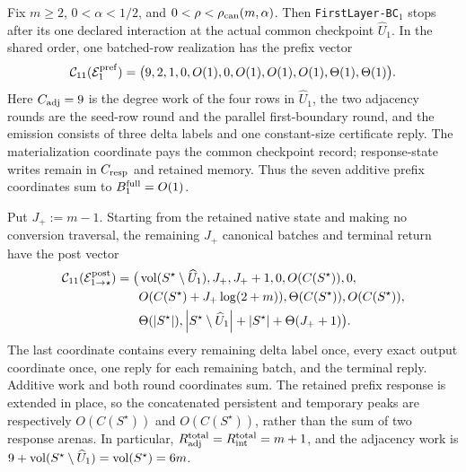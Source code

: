 \begin{theorem}
\label{thm:branch-caterpillar-first-layer-prefix}
Fix $m\geq2$, $0<\alpha<1/2$, and
$0<\rho<\rho_{\rm can}(m,\alpha)$.  Then
\texttt{FirstLayer-BC}$_1$ stops after its one declared interaction at the
actual common checkpoint $\widehat U_1$.  In the shared order, one batched-row
realization has the prefix vector
\begin{equation}
 \mathcal C_{11}(\mathcal E_1^{\rm pref})
 =\bigl(9,2,1,0,O(1),0,O(1),O(1),O(1),\Theta(1),\Theta(1)\bigr).
 \label{eq:branch-caterpillar-first-layer-prefix-eleven-vector}
\end{equation}
Here $C_{\rm adj}=9$ is the degree work of the four rows in
$\widehat U_1$, the two adjacency rounds are the seed-row round and the
parallel first-boundary round, and the emission consists of three delta labels
and one constant-size certificate reply.  The materialization coordinate pays
the common checkpoint record; response-state writes remain in
$C_{\rm resp}$ and retained memory.  Thus the seven additive prefix
coordinates sum to $B_1^{\rm full}=O(1)$.

Put $J_+:=m-1$.  Starting from the retained native state and making no
conversion traversal, the remaining $J_+$ canonical batches and terminal
return have the post vector
\begin{equation}
 \begin{aligned}
 \mathcal C_{11}(\mathcal E_{1\to\star}^{\rm post})=\bigl(&
 \operatorname{vol}(S^\star\setminus\widehat U_1),J_+,J_++1,0,
 O(C(S^\star)),0,\\
 &O(C(S^\star)+J_+\log(2+m)),
 \Theta(C(S^\star)),O(C(S^\star)),\\
 &\Theta(\left\lvert S^\star \right\rvert),
 \left\lvert S^\star\setminus\widehat U_1 \right\rvert
 +\left\lvert S^\star \right\rvert+\Theta(J_++1)\bigr).
 \end{aligned}
 \label{eq:branch-caterpillar-first-layer-post-eleven-vector}
\end{equation}
The last coordinate contains every remaining delta label once, every exact
output coordinate once, one reply for each remaining batch, and the terminal
reply.  Additive work and both round coordinates sum.  The retained prefix
response is extended in place, so the concatenated persistent and temporary
peaks are respectively $O(C(S^\star))$ and $O(C(S^\star))$, rather than the
sum of two response arenas.  In particular,
$R_{\rm adj}^{\rm total}=R_{\rm int}^{\rm total}=m+1$, and the adjacency work
is $9+\operatorname{vol}(S^\star\setminus\widehat U_1)=\operatorname{vol}(S^\star)=6m$.
\end{theorem}

